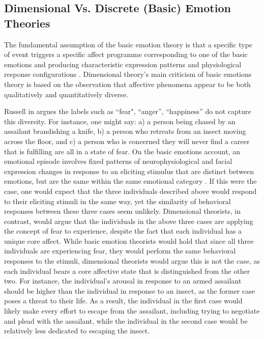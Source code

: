 \documentclass[11pt]{article}
\begin{document}
\subsection{Dimensional Vs. Discrete (Basic) Emotion Theories}

The fundamental assumption of the basic emotion theory is that a specific type
of event triggers a specific affect programme corresponding to one of the basic
emotions and producing characteristic expression patterns and physiological
response configurations \cite{scherer:emotions-emergent}. Dimensional theory's
main criticism of basic emotions theory is based on the observation that
affective phenomena appear to be both qualitatively and quantitatively diverse.

Russell in \cite{russell:core-affect} argues the labels such as ``fear",
``anger'', ``happiness'' do not capture this diversity. For instance, one might
say: a) a person being chased by an assailant brandishing a knife, b) a person
who retreats from an insect moving across the floor, and c) a person who is
concerned they will never find a career that is fulfilling are all in a state of
fear. On the basic emotions account, an emotional episode involves fixed
patterns of neurophysiological and facial expression changes in response to an
eliciting stimulus that are distinct between emotions, but are the same within
the same emotional category \cite{ekman:argument-emotions}. If this were the
case, one would expect that the three individuals described above would respond
to their eliciting stimuli in the same way, yet the similarity of behavioral
responses between these three cases seem unlikely. Dimensional theorists, in
contrast, would argue that the individuals in the above three cases are applying
the concept of fear to experience, despite the fact that each individual has a
unique core affect. While basic emotion theorists would hold that since all
three individuals are experiencing fear, they would perform the same behavioral
responses to the stimuli, dimensional theorists would argue this is not the
case, as each individual bears a core affective state that is distinguished from
the other two. For instance, the individual's arousal in response to an armed
assailant should be higher than the individual in response to an insect, as the
former case poses a threat to their life. As a result, the individual in the
first case would likely make every effort to escape from the assailant,
including trying to negotiate and plead with the assailant, while the individual
in the second case would be relatively less dedicated to escaping the insect. 
\end{document}
